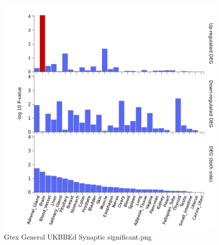 \begin{figure}
\end{figure}

\begin{figure}
    \centering
    \includegraphics[width=\textwidth]{images/FUMA_plots/gtex_v8_ts_general_FUMA_gene2func_UKBBEd_syn_protein_bp_sig.png}
    \caption{Gtex General UKBBEd Synaptic significant.png}
    \label{fig:ukbbed gtex}
\end{figure}


